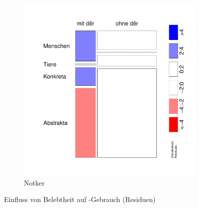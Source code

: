 \begin{figure}
\begin{subfigure}[b]{.5\linewidth}
  \includegraphics[width=6 cm]{generated/images/residuals-bel-N}
\caption {Notker}
\end{subfigure}
\caption{Einfluss von Belebtheit auf -Gebrauch (Residuen)}
\label{fig:residuals-bel}
\end{figure}


